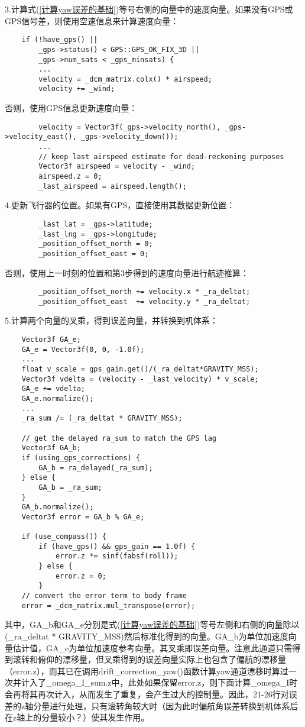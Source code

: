 \documentclass[a4paper,10pt]{ctexart} %
\begin{document}
3.计算式(\ref{计算yaw误差的基础})等号右侧的向量中的速度向量。如果没有GPS或GPS信号差，则使用空速信息来计算速度向量：
\begin{lstlisting}
    if (!have_gps() ||
        _gps->status() < GPS::GPS_OK_FIX_3D ||
        _gps->num_sats < _gps_minsats) {
		...
        velocity = _dcm_matrix.colx() * airspeed;
        velocity += _wind;
\end{lstlisting}
否则，使用GPS信息更新速度向量：
\begin{lstlisting}
        velocity = Vector3f(_gps->velocity_north(), _gps->velocity_east(), _gps->velocity_down());
		...
        // keep last airspeed estimate for dead-reckoning purposes
        Vector3f airspeed = velocity - _wind;
        airspeed.z = 0;
        _last_airspeed = airspeed.length(); 
\end{lstlisting}

4.更新飞行器的位置。如果有GPS，直接使用其数据更新位置：
\begin{lstlisting}
        _last_lat = _gps->latitude;
        _last_lng = _gps->longitude;
        _position_offset_north = 0;
        _position_offset_east = 0;
\end{lstlisting}
否则，使用上一时刻的位置和第3步得到的速度向量进行航迹推算：
\begin{lstlisting}
        _position_offset_north += velocity.x * _ra_deltat;
        _position_offset_east  += velocity.y * _ra_deltat;
\end{lstlisting}

5.计算两个向量的叉乘，得到误差向量，并转换到机体系：
\begin{lstlisting}
    Vector3f GA_e;
    GA_e = Vector3f(0, 0, -1.0f);
	...
    float v_scale = gps_gain.get()/(_ra_deltat*GRAVITY_MSS);
    Vector3f vdelta = (velocity - _last_velocity) * v_scale;
    GA_e += vdelta;
    GA_e.normalize();
    ...
    _ra_sum /= (_ra_deltat * GRAVITY_MSS);

    // get the delayed ra_sum to match the GPS lag
    Vector3f GA_b;
    if (using_gps_corrections) {
        GA_b = ra_delayed(_ra_sum);
    } else {
        GA_b = _ra_sum;
    }
    GA_b.normalize();
    Vector3f error = GA_b % GA_e;
    
    if (use_compass()) {
        if (have_gps() && gps_gain == 1.0f) {
            error.z *= sinf(fabsf(roll));
        } else {
            error.z = 0;
        }
    // convert the error term to body frame
    error = _dcm_matrix.mul_transpose(error);
\end{lstlisting}
其中，GA\_b和GA\_e分别是式(\ref{计算yaw误差的基础})等号左侧和右侧的向量除以(\_ra\_deltat * GRAVITY\_MSS)然后标准化得到的向量。GA\_b为单位加速度向量估计值，GA\_e为单位加速度参考向量。其叉乘即误差向量。注意此通道只需得到滚转和俯仰的漂移量，但叉乘得到的误差向量实际上也包含了偏航的漂移量（error.z），而其已在调用drift\_correction\_yaw()函数计算yaw通道漂移时算过一次并计入了\_omega\_I\_sum.z中，此处如果保留error.z，则下面计算\_omega\_I时会再将其再次计入，从而发生了重复，会产生过大的控制量。因此，21-26行对误差的z轴分量进行处理，只有滚转角较大时（因为此时偏航角误差转换到机体系后在z轴上的分量较小？）使其发生作用。
\end{document}

